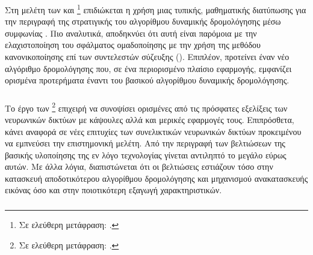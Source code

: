 \subsubsection{}

Στη μελέτη των  και  \footnote{Σε ελεύθερη μετάφραση: .} \cite{wang2018optimization} επιδιώκεται η χρήση μιας τυπικής, μαθηματικής διατύπωσης για την περιγραφή της στρατιγικής του αλγορίθμου δυναμικής δρομολόγησης μέσω συμφωνίας \cite{sabour2017dynamic}. Πιο αναλυτικά, αποδηκνύει ότι αυτή είναι παρόμοια με την ελαχιστοποίηση του σφάλματος ομαδοποίησης με την χρήση της μεθόδου κανονικοποίησης  επί των συντελεστών σύζευξης (). Επιπλέον, προτείνει έναν νέο αλγόριθμο δρομολόγησης που, σε ένα περιορισμένο πλαίσιο εφαρμογής, εμφανίζει ορισμένα προτερήματα έναντι του βασικού αλγορίθμου δυναμικής δρομολόγησης.


\subsubsection{}

Το έργο των  \footnote{Σε ελεύθερη μετάφραση: .} \cite{pande2018analysis} επιχειρή να συνοψίσει ορισμένες από τις πρόσφατες εξελίξεις των νευρωνικών δικτύων με κάψουλες αλλά και μερικές εφαρμογές τους. Επιπρόσθετα, κάνει αναφορά σε νέες επιτυχίες των συνελικτικών νευρωνικών δικτύων προκειμένου να εμπνεύσει την επιστημονική μελέτη. Από την περιγραφή των βελτιώσεων της βασικής υλοποίησης της εν λόγο τεχνολογίας γίνεται αντιληπτό το μεγάλο εύρως αυτών. Με άλλα λόγια, διαπιστώνεται ότι οι βελτιώσεις εστιάζουν τόσο στην κατασκευή αποδοτικότερου αλγορίθμου δρομολόγησης και μηχανισμού ανακατασκευής εικόνας όσο και στην ποιοτικότερη εξαγωγή χαρακτηριστικών. 


\subsubsection{}

